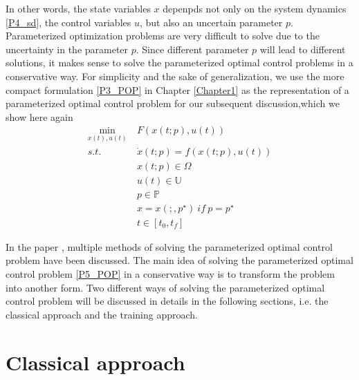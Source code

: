 \documentclass  [
  paper    = a4,
  BCOR     = 10mm,
  twoside,
  fontsize = 12pt,
  fleqn,
  toc      = bibnumbered,
  toc      = listofnumbered,
  numbers  = noendperiod,
  headings = normal,
  listof   = leveldown,
  version  = 3.03
]                                       {scrreprt}
\newcommand{\<}{\langle}
\renewcommand{\>}{\rangle}
\begin{document}
In other words, the state variables $x$ depenpds not only on the system dynamics \ref{P4_sd}, the control variables $u$, but also an uncertain parameter $p$. Parameterized optimization problems are very difficult to solve due to the uncertainty in the parameter $p$. Since different parameter $p$ will lead to different solutions, it makes sense to solve the parameterized optimal control problems in a conservative way. For simplicity and the sake of generalization, we use the more compact formulation \ref{P3_POP} in  Chapter \ref{Chapter1} as the representation of a parameterized optimal control problem for our subsequent discussion,which we show  here again
      \begin{equation}
	\begin{aligned}
	\underset{x(t), u(t)}{\text{min}}  \ &  F(x(t;p), u(t)) \\
	s.t.\ \  &  \dot{x} (t;p) = f(x(t;p), u(t))\\ 
	& x(t;p) \in \Omega \\
	& u(t) \in \mathbb{U}  \\
	& p  \in   \mathbb{P}  \\
	& x = x(;,p^\star) \ if \ p = p^\star \\
	& t \in [t_0, t_f]
\end{aligned}
	\label{P5_POP}
\end{equation}

 In the paper \cite{MatSch22}, multiple methods of solving the parameterized optimal control problem have been discussed. The main idea of solving the parameterized optimal control problem \ref{P5_POP}  in a conservative way is to transform the problem into another form. Two different ways of solving the parameterized optimal control problem will be discussed in details in the following sections, i.e. the classical approach and the training approach. 



\section{Classical approach}
\label{Sec:CA}
\end{document}
